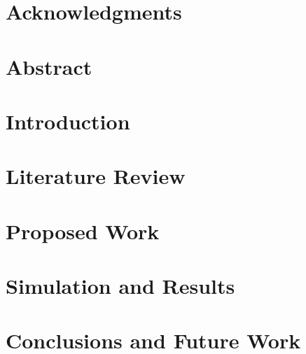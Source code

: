 \documentclass[a4paper, 11pt, oneside]{Dissertation}
\begin{document}
\sloppy
{}








\chapter*{Acknowledgments}
\label{ch:ack}


\chapter*{Abstract}
\label{ch:abstract}




\pagestyle{fancy}
\tableofcontents
\listoffigures
\listoftables
\newpage

\mainmatter	  

\chapter{Introduction}
\label{ch:intro}


\chapter{Literature Review}
\label{ch:literature}


\chapter{Proposed Work}
\label{ch:new}


\chapter{Simulation and Results}
\label{ch:result}


\chapter{Conclusions and Future Work}
\label{ch:conclude}


\newpage
{}


\end{document}
